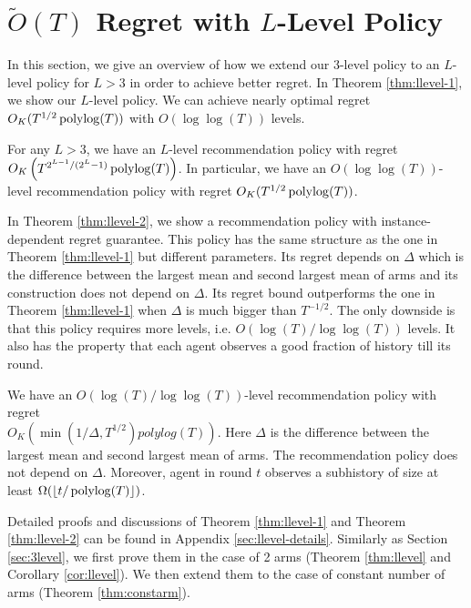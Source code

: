 
\section{$\tilde O(T)$ Regret with $L$-Level Policy}
\label{sec:llevel}
In this section, we give an overview of how we extend our 3-level policy to an $L$-level policy for $L > 3$ in order to achieve better regret. In Theorem \ref{thm:llevel-1}, we show our $L$-level policy. We can achieve nearly optimal regret $O_K(T^{1/2} \polylog(T))$ with $O(\log\log(T))$ levels.
\begin{theorem}
\label{thm:llevel-1}
For any $L > 3$, we have an $L$-level recommendation policy with regret \\$O_K\left(T^{2^{L-1}/(2^L-1)} \polylog(T) \right)$. In particular, we have an $O(\log\log(T))$-level recommendation policy with regret $O_K(T^{1/2} \polylog(T))$. 
\end{theorem}

In Theorem \ref{thm:llevel-2}, we show a recommendation policy with instance-dependent regret guarantee. This policy has the same structure as the one in Theorem \ref{thm:llevel-1} but different parameters. Its regret depends on $\Delta$ which is the difference between the largest mean and second largest mean of arms and its construction does not depend on $\Delta$. Its regret bound outperforms the one in Theorem \ref{thm:llevel-1} when $\Delta$ is much bigger than $T^{-1/2}$. The only downside is that this policy requires more levels, i.e. $O(\log(T)/\log\log(T))$ levels. It also has the property that each agent observes a good fraction of history till its round. 

\begin{theorem}
\label{thm:llevel-2}
 We have an $O(\log(T)/\log\log(T))$-level recommendation policy with regret \\$O_K(\min(1/\Delta, T^{1/2})polylog(T))$. Here $\Delta$ is the difference between the largest mean and second largest mean of arms. The recommendation policy does not depend on $\Delta$. Moreover, agent in round $t$ observes a subhistory of size at least $\Omega( \lfloor t/\polylog(T)\rfloor)$. 
\end{theorem}

Detailed proofs and discussions of Theorem \ref{thm:llevel-1} and Theorem \ref{thm:llevel-2} can be found in Appendix \ref{sec:llevel-details}. Similarly as Section \ref{sec:3level}, we first prove them in the case of 2 arms (Theorem \ref{thm:llevel} and Corollary \ref{cor:llevel}). We then extend them to the case of constant number of arms (Theorem \ref{thm:constarm}).

